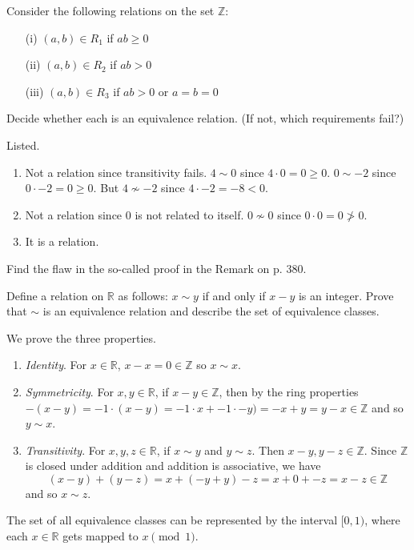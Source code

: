   \begin{exercise}
    Consider the following relations on the set $\mathbb{Z}$:
    \begin{enumerate}
      \item[(i)] $(a, b) \in R_1$ \quad if $ab \geq 0$
      \item[(ii)] $(a, b) \in R_2$ \quad if $ab > 0$
      \item[(iii)] $(a, b) \in R_3$ \quad if $ab > 0$ or $a = b = 0$
    \end{enumerate}
    Decide whether each is an equivalence relation. (If not, which requirements fail?)
  \end{exercise}
  \begin{solution}
    Listed. 
    \begin{enumerate}
      \item Not a relation since transitivity fails. $4 \sim 0$ since $4 \cdot 0 = 0 \geq 0$. $0 \sim -2$ since $0 \cdot -2 = 0 \geq 0$. But $4 \not\sim -2$ since $4 \cdot -2 = -8 < 0$. 
      \item Not a relation since $0$ is not related to itself. $0 \not\sim 0$ since $0 \cdot 0 = 0 \not> 0$. 
      \item It is a relation. 
    \end{enumerate}
  \end{solution}

  \begin{exercise}
    Find the flaw in the so-called proof in the Remark on p. 380.
  \end{exercise}

  \begin{exercise}
    Define a relation on $\mathbb{R}$ as follows: $x \sim y$ if and only if $x - y$ is an integer. Prove that $\sim$ is an equivalence relation and describe the set of equivalence classes.
  \end{exercise}
  \begin{solution}
    We prove the three properties. 
    \begin{enumerate}
      \item \textit{Identity}. For $x \in \mathbb{R}$, $x - x = 0 \in \mathbb{Z}$ so $x \sim x$. 
      \item \textit{Symmetricity}. For $x, y \in \mathbb{R}$, if $x - y \in \mathbb{Z}$, then by the ring properties $-(x - y) = -1 \cdot (x - y) = -1 \cdot x + -1 \cdot -y) = -x + y = y - x \in \mathbb{Z}$ and so $y \sim x$. 
      \item \textit{Transitivity}. For $x, y, z \in \mathbb{R}$, if $x \sim y$ and $y \sim z$. Then $x - y, y - z \in \mathbb{Z}$. Since $\mathbb{Z}$ is closed under addition and addition is associative, we have 
        \begin{equation}
          (x - y) + (y - z) = x + (-y + y) - z = x + 0 + -z = x - z \in \mathbb{Z}
        \end{equation}
        and so $x \sim z$. 
    \end{enumerate}
    The set of all equivalence classes can be represented by the interval $[0, 1)$, where each $x \in \mathbb{R}$ gets mapped to $x \pmod{1}$. 
  \end{solution}

